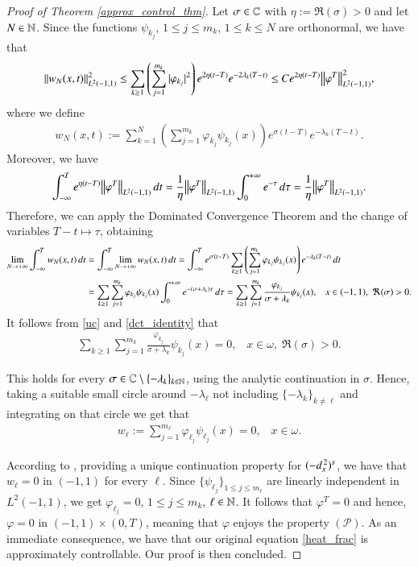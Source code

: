 \begin{proof}[Proof of Theorem \ref{approx_control_thm}]
Let $\sigma\in\mathbb{C}$ with $\eta:=\Re(\sigma)>0$ and let $N\in\mathbb{N}$. Since the functions $\psi_{k_j}$, $1\leq j\leq m_k$, $1\leq k\leq N$ are orthonormal, we have that
\begin{align*}
	{\left\|w_N(x,t)\right\|}_{L^2(-1,1)}^2 \leq \sum_{k\geq 1} \left(\sum_{j=1}^{m_k} |\varphi_{k_j}|^2\right)e^{2\eta(t-T)}e^{-2\lambda_k(T-t)} \leq Ce^{2\eta(t-T)}{\left\|\varphi^T\right\|}_{L^2(-1,1)}^2,
\end{align*}
where we define
\begin{align*}
	w_N(x,t):= \sum_{k=1}^N \left(\sum_{j=1}^{m_k} \varphi_{k_j}\psi_{k_j}(x)\right)e^{\sigma(t-T)}e^{-\lambda_k(T-t)}.
\end{align*}
Moreover, we have
\begin{align*}
	\int_{-\infty}^T e^{\eta(t-T)}{\left\|\varphi^T\right\|}_{L^2(-1,1)}\,dt = \frac{1}{\eta}{\left\|\varphi^T\right\|}_{L^2(-1,1)}\int_0^{+\infty} e^{-\tau}\,d\tau = \frac{1}{\eta}{\left\|\varphi^T\right\|}_{L^2(-1,1)}.
\end{align*}
Therefore, we can apply the Dominated Convergence Theorem and the change of variables $T-t\mapsto\tau$, obtaining
\begin{align}\label{dct_identity}
	\lim_{N\to+\infty}\int_{-\infty}^T w_N(x,t)\,dt &= \int_{-\infty}^T\lim_{N\to+\infty} w_N(x,t)\,dt = \int_{-\infty}^T e^{\sigma(t-T)} \sum_{k\geq1} \left(\sum_{j=1}^{m_k} \varphi_{k_j}\psi_{k_j}(x)\right)e^{-\lambda_k(T-t)}\,dt \notag
	\\
	&=\sum_{k\geq1}\sum_{j=1}^{m_k} \varphi_{k_j}\psi_{k_j}(x) \int_0^{+\infty} e^{-(\sigma+\lambda_k)\tau}\,d\tau = \sum_{k\geq1}\sum_{j=1}^{m_k} \frac{\varphi_{k_j}}{\sigma+\lambda_k}\psi_{k_j}(x), \;\;\; x\in (-1,1),\;\Re(\sigma)>0.
\end{align} 
It follows from \eqref{uc} and \eqref{dct_identity} that 
\begin{align*}
	\sum_{k\geq1}\sum_{j=1}^{m_k} \frac{\varphi_{k_j}}{\sigma+\lambda_k}\psi_{k_j}(x)=0, \;\;\; x\in\omega,\;\Re(\sigma)>0.
\end{align*}

This holds for every $\sigma\in\mathbb{C}\setminus\{-\lambda_k\}_{k\in\mathbb{N}}$, using the analytic continuation in $\sigma$. Hence, taking a suitable small circle around $-\lambda_{\ell}$ not including $\{-\lambda_k\}_{k\neq\ell}$ and integrating on that circle we get that
\begin{align*}
	w_\ell:=\sum_{j=1}^{m_{\ell}} \varphi_{\ell_j}\psi_{\ell_j}(x)=0, \;\;\; x\in\omega.
\end{align*}
	
According to \cite[Theorem 1.4]{fall2014unique}, providing a unique continuation property for $(-d_x^{\,2})^{s}$, we have that $w_{\ell} = 0$ in $(-1,1)$ for every $\ell$. Since $\{\psi_{\ell_j}\}_{1\leq j\leq m_{\ell}}$ are linearly independent in $L^2(-1,1)$, we get $\varphi_{\ell_j} = 0$, $1\leq j\leq m_k$, $\ell\in\mathbb{N}$. It follows that $\varphi^T=0$ and hence, $\varphi=0$ in $(-1,1)\times(0,T)$, meaning that $\varphi$ enjoys the property $(\mathcal{P})$. As an immediate consequence, we have that our original equation \eqref{heat_frac} is approximately controllable. Our proof is then concluded. 
\end{proof}

